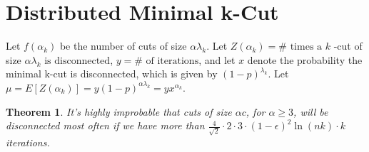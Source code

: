 \documentclass[12pt]{article}
\newtheorem{theorem}{Theorem}
\begin{document}
\section{Distributed Minimal k-Cut}

Let $f(\alpha_k)$ be the number of cuts of size $\alpha \lambda_k$. Let $Z(\alpha_k) = \# \text{ times a } k$ -cut of size 
$\alpha \lambda_k \text{ is disconnected}$, $y = \# \text{ of iterations}$, and let $x$ denote the probability the minimal k-cut is disconnected, which is given by $(1 - p)^{\lambda_k}$. Let $\mu = E[Z(\alpha_k)] = y(1-p)^{\alpha \lambda_k} = yx^{\alpha_k}$.

\begin{theorem} It's highly improbable that cuts of size $\alpha c$, for $\alpha \geq 3$, will be disconnected most often if we have more than $\frac{4}{\sqrt{2}} \cdot 2 \cdot 3 \cdot (1-\epsilon)^2 \ln{(nk)} \cdot k$ iterations.
\end{theorem}
\end{document}
